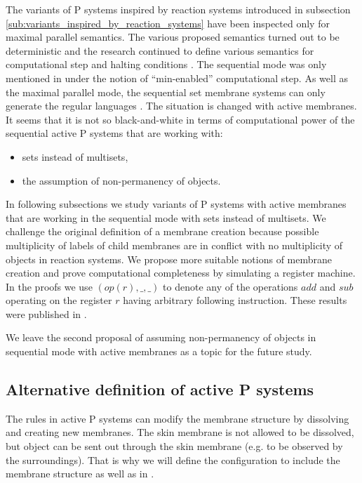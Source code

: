 The variants of P systems inspired by  reaction systems introduced in subsection \ref{sub:variants_inspired_by_reaction_systems} have been inspected only for maximal parallel semantics. The various proposed semantics turned out to be deterministic and the research continued to define various semantics for computational step \cite{Kleijn11SetMembrane} and halting conditions \cite{Paun12BridgingReactionSystems}. The sequential mode was only mentioned in \cite{Kleijn11SetMembrane} under the notion of ``min-enabled'' computational step. As well as the maximal parallel mode, the sequential set membrane systems can only generate the regular languages \cite{Alhazov05WithoutMultiplicities}. The situation is changed with active membranes. It seems that it is not so black-and-white in terms of computational power of the sequential active P systems that are working with:
\begin{itemize}
  \item sets instead of multisets,
  \item the assumption of non-permanency of objects.
\end{itemize}

In following subsections we study variants of P systems with active membranes that are working in the sequential mode with sets instead of multisets. We challenge the original definition of a membrane creation because possible multiplicity of labels of child membranes are in conflict with no multiplicity of objects in reaction systems. We propose more suitable notions of membrane creation and prove computational completeness by simulating a register machine. In the proofs we use $(op(r), \_, \_)$ to denote any of the operations $add$ and $sub$ operating on the register $r$ having arbitrary following instruction. These results were published in \cite{Kovac15SequentialActiveSet}.

We leave the second proposal of assuming non-permanency of objects in sequential mode with active membranes as a topic for the future study.

\subsection{Alternative definition of active P systems} %
\label{sub:alternative_definition_of_active_p_systems}
  The rules in active P systems can modify the membrane structure by dissolving and creating new membranes. The skin membrane is not allowed to be dissolved, but object can be sent out through the skin membrane (e.g. to be observed by the surroundings). That is why we will define the configuration to include the membrane structure as well as in \cite{Kovac15SequentialActiveSet}.

